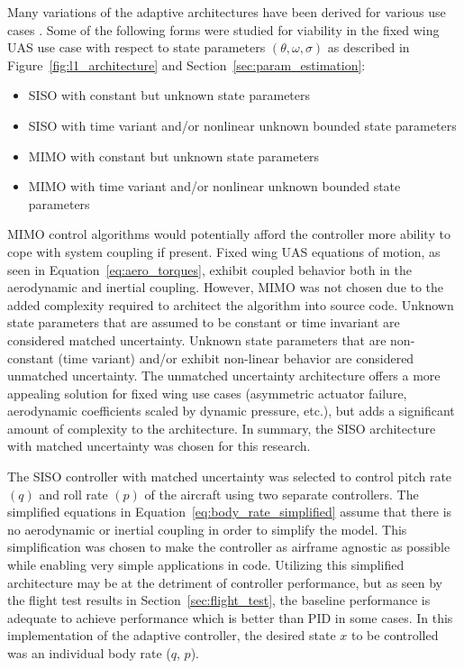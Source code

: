 Many variations of the \Lone adaptive architectures have been derived for various use cases \cite{hovakimyan2010l1}.  Some of the following forms were studied for viability in the fixed wing \ac{UAS} use case with respect to state parameters $(\theta, \omega, \sigma)$ as described in Figure~\ref{fig:l1_architecture} and Section~\ref{sec:param_estimation}:
\begin{itemize}
 \item \ac{SISO} with constant but unknown state parameters
 \item \ac{SISO} with time variant and/or nonlinear unknown bounded state parameters
 \item \ac{MIMO} with constant but unknown state parameters 
 \item \ac{MIMO} with time variant and/or nonlinear unknown bounded state parameters
\end{itemize}

\ac{MIMO} control algorithms would potentially afford the controller more ability to cope with system coupling if present.  Fixed wing \ac{UAS} equations of motion, as seen in Equation~\ref{eq:aero_torques}, exhibit coupled behavior both in the aerodynamic and inertial coupling.  However, \ac{MIMO} was not chosen due to the added complexity required to architect the algorithm into source code.  Unknown state parameters that are assumed to be constant or time invariant are considered matched uncertainty.  Unknown state parameters that are non-constant (time variant) and/or exhibit non-linear behavior are considered unmatched uncertainty.  The unmatched uncertainty architecture offers a more appealing solution for fixed wing use cases (asymmetric actuator failure, aerodynamic coefficients scaled by dynamic pressure, etc.), but adds a significant amount of complexity to the architecture.  In summary, the \ac{SISO} architecture with matched uncertainty was chosen for this research.  

The \ac{SISO} controller with matched uncertainty was selected to control pitch rate $(q)$ and roll rate $(p)$ of the aircraft using two separate controllers.  The simplified equations in Equation~\ref{eq:body_rate_simplified} assume that there is no aerodynamic or inertial coupling in order to simplify the model.  This simplification was chosen to make the controller as airframe agnostic as possible while enabling very simple applications in code.  Utilizing this simplified architecture may be at the detriment of controller performance, but as seen by the flight test results in Section~\ref{sec:flight_test}, the baseline performance is adequate to achieve performance which is better than \ac{PID} in some cases.  In this implementation of the \Lone adaptive controller, the desired state $x$ to be controlled was an individual body rate (\eg $q$, $p$). 

